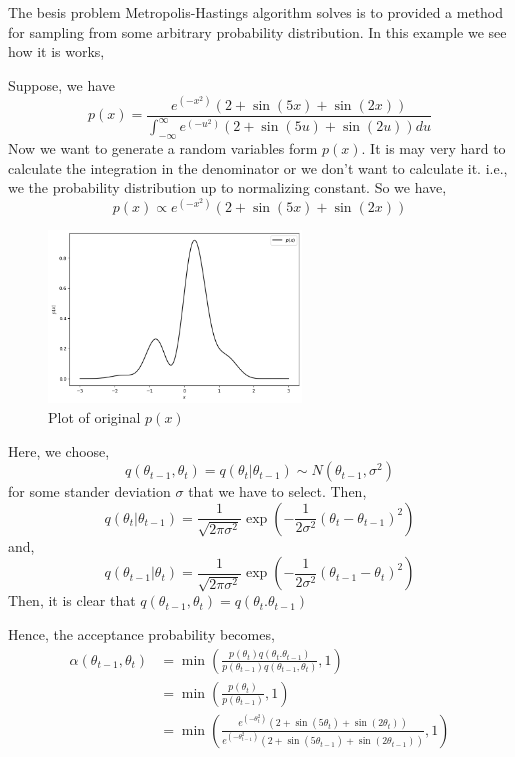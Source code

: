 \begin{example}
    The besis problem Metropolis-Hastings algorithm solves is to provided a method for sampling from some arbitrary probability distribution. In this example we see how it is works,

    Suppose, we have 
    \[
        p(x) = \frac{e^{(-x^2)} \left( 2 + \sin(5x) + \sin(2x) \right) }{ \int_{-\infty}^{\infty} e^{(-u^2)} \left( 2 + \sin(5u) + \sin(2u) \right) du }
    \]
    Now we want to generate a random variables form $ p(x) $. It is may very hard to calculate the integration in the denominator or we don't want to calculate it. i.e., we the probability distribution up to normalizing constant.
    So we have,
    \[
        p(x) \propto e^{(-x^2)} \left( 2 + \sin(5x) + \sin(2x) \right) 
    \]
    \begin{figure}[H]
        \centering
        \includegraphics[width=0.6\textwidth]{./images/metropolis/plot-of-px.png}
        \caption{Plot of original $p(x)$}
        \label{plot of px}
    \end{figure}

    Here, we choose,
    \[
        q(\theta_{t-1}, \theta_{t}) = q(\theta_t|\theta_{t-1}) \sim N(\theta_{t-1},\sigma^2)
    \]
    for some stander deviation $ \sigma $ that we have to select.
    Then,
    \[
        q(\theta_{t} | \theta_{t-1}) = \frac{1}{\sqrt{2 \pi \sigma^2}} \exp \left( - \frac{1}{2 \sigma^2} (\theta_t - \theta_{t-1})^2 \right) 
    \]
    and,
    \[
        q(\theta_{t-1}|\theta_t) = \frac{1}{\sqrt{2 \pi \sigma^2}} \exp \left( - \frac{1}{2 \sigma^2} (\theta_{t-1} - \theta_{t})^2 \right)
    \]
    Then, it is clear that $ q(\theta_{t-1},\theta_t) = q(\theta_t.\theta_{t-1}) $
    
    Hence, the acceptance probability becomes,
    \begin{align*}
        \alpha(\theta_{t-1},\theta_{t}) &= \min \left(  \frac{p(\theta_t)q(\theta_t.\theta_{t-1})}{p(\theta_{t-1})q(\theta_{t-1},\theta_t)}  , 1 \right) \\ 
                                        &= \min \left( \frac{p(\theta_t)}{p(\theta_{t-1})} , 1 \right) \\
                                        &= \min \left( \frac{e^{(-\theta_t^2)}(2 + \sin(5 \theta_t) + \sin(2 \theta_t)) }{e^{(-\theta_{t-1}^2)}(2 + \sin(5 \theta_{t-1}) + \sin(2 \theta_{t-1})) }  , 1 \right)
    \end{align*}
    

\end{example}
